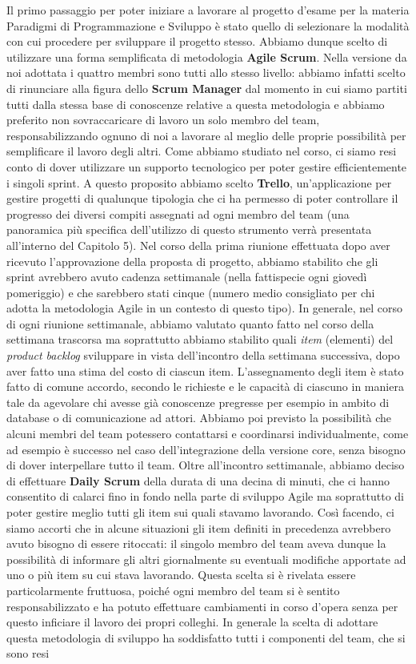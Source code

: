         Il primo passaggio per poter iniziare a lavorare al progetto d'esame per la materia Paradigmi di Programmazione e Sviluppo è stato quello di selezionare la modalità con cui procedere per sviluppare il progetto stesso. Abbiamo dunque scelto di utilizzare una forma semplificata di metodologia \textbf{Agile Scrum}. Nella versione da noi adottata i quattro membri sono tutti allo stesso livello: abbiamo infatti scelto di rinunciare alla figura dello \textbf{Scrum Manager} dal momento in cui siamo partiti tutti dalla stessa base di conoscenze relative a questa metodologia e abbiamo preferito non sovraccaricare di lavoro un solo membro del team, responsabilizzando ognuno di noi a lavorare al meglio delle proprie possibilità per semplificare il lavoro degli altri. Come abbiamo studiato nel corso, ci siamo resi conto di dover utilizzare un supporto tecnologico per poter gestire efficientemente i singoli sprint. A questo proposito abbiamo scelto \textbf{Trello}, un'applicazione per gestire progetti di qualunque tipologia che ci ha permesso di poter controllare il progresso dei diversi compiti assegnati ad ogni membro del team (una panoramica più specifica dell'utilizzo di questo strumento verrà presentata all'interno del Capitolo 5). Nel corso della prima riunione effettuata dopo aver ricevuto l'approvazione della proposta di progetto, abbiamo stabilito che gli sprint avrebbero avuto cadenza settimanale (nella fattispecie ogni giovedì pomeriggio) e che sarebbero stati cinque (numero medio consigliato per chi adotta la metodologia Agile in un contesto di questo tipo). In generale, nel corso di ogni riunione settimanale, abbiamo valutato quanto fatto nel corso della settimana trascorsa ma soprattutto abbiamo stabilito quali \textit{item} (elementi) del \textit{product backlog} sviluppare in vista dell'incontro della settimana successiva, dopo aver fatto una stima del costo di ciascun item. L'assegnamento degli item è stato fatto di comune accordo, secondo le richieste e le capacità di ciascuno in maniera tale da agevolare chi avesse già conoscenze pregresse per esempio in ambito di database o di comunicazione ad attori. Abbiamo poi previsto la possibilità che alcuni membri del team potessero contattarsi e coordinarsi individualmente, come ad esempio è successo nel caso dell'integrazione della versione core, senza bisogno di dover interpellare tutto il team. Oltre all'incontro settimanale, abbiamo deciso di effettuare \textbf{Daily Scrum} della durata di una decina di minuti, che ci hanno consentito di calarci fino in fondo nella parte di sviluppo Agile ma soprattutto di poter gestire meglio tutti gli item sui quali stavamo lavorando. Così facendo, ci siamo accorti che in alcune situazioni gli item definiti in precedenza avrebbero avuto bisogno di essere ritoccati: il singolo membro del team aveva dunque la possibilità di informare gli altri giornalmente su eventuali modifiche apportate ad uno o più item su cui stava lavorando. Questa scelta si è rivelata essere particolarmente fruttuosa, poiché ogni membro del team si è sentito responsabilizzato e ha potuto effettuare cambiamenti in corso d'opera senza per questo inficiare il lavoro dei propri colleghi. In generale la scelta di adottare questa metodologia di sviluppo ha soddisfatto tutti i componenti del team, che si sono resi 